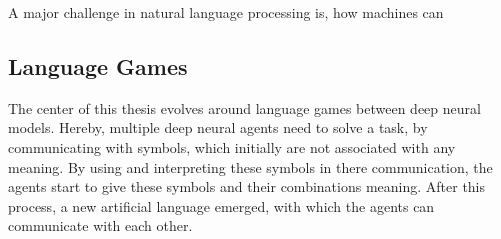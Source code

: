 A major challenge in natural language processing is, how machines can

\subsection{Language Games}

The center of this thesis evolves around language games between deep neural models.
Hereby, multiple deep neural agents need to solve a task, by communicating with symbols, which initially are not associated with any meaning.
By using and interpreting these symbols in there communication, the agents start to give these symbols and their combinations meaning.
After this process, a new artificial language emerged, with which the agents can communicate with each other.

